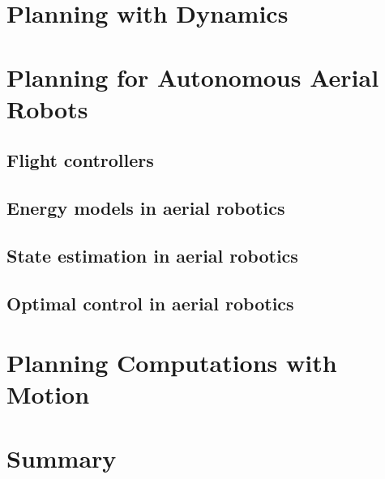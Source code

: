 \section{\color{red}Planning with Dynamics}
\label{sec:soa-dynamics-pl}

\section{\color{red}Planning for Autonomous Aerial Robots}
\label{sec:soa-aerial-pl}

\subsection{\color{red}Flight controllers}

\subsection{\color{orange}Energy models in aerial robotics}

\subsection{\color{orange}State estimation in aerial robotics}

\subsection{\color{orange}Optimal control in aerial robotics}


\section{\color{red}Planning Computations with Motion}
\label{sec:soa-comp-motion-pl}

\section{\color{red}Summary}


